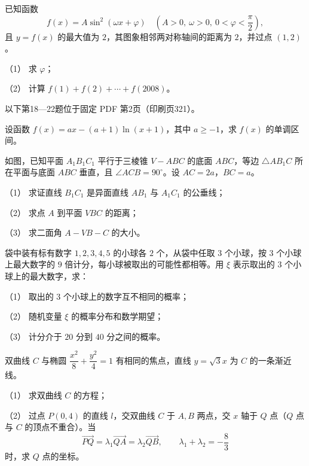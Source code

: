\begin{question}
已知函数
\nopagebreak[4]
\[
f(x)=A\sin^2(\omega x+\varphi)\quad
\left(A>0,\ \omega>0,\ 0<\varphi<\dfrac{\pi}{2}\right),
\]
且 $y=f(x)$ 的最大值为 $2$，其图象相邻两对称轴间的距离为 $2$，并过点 $(1,2)$。

（1） 求 $\varphi$；

（2） 计算 $f(1)+f(2)+\cdots+f(2008)$。

\begin{gktip}
以下第18—22题位于固定 PDF 第2页（印刷页321）。
\end{gktip}

\end{question}
\begin{question}
设函数 $f(x)=ax-(a+1)\ln(x+1)$，其中 $a\ge -1$，求 $f(x)$ 的单调区间。

\Needspace{0.4\textheight}
\end{question}
\begin{question}
如图，已知平面 $A_1B_1C_1$ 平行于三棱锥 $V-ABC$ 的底面 $ABC$，等边 $\triangle AB_1C$ 所在平面与底面 $ABC$ 垂直，且 $\angle ACB=90^\circ$。设 $AC=2a$，$BC=a$。

（1） 求证直线 $B_1C_1$ 是异面直线 $AB_1$ 与 $A_1C_1$ 的公垂线；

（2） 求点 $A$ 到平面 $VBC$ 的距离；

（3） 求二面角 $A-VB-C$ 的大小。
\nopagebreak[4]
\begin{center}\end{center}
\nopagebreak[4]
\end{question}
\begin{question}
袋中装有标有数字 $1,2,3,4,5$ 的小球各 $2$ 个，从袋中任取 $3$ 个小球，按 $3$ 个小球上最大数字的 $9$ 倍计分，每小球被取出的可能性都相等。用 $\xi$ 表示取出的 $3$ 个小球上的最大数字，求：

（1） 取出的 $3$ 个小球上的数字互不相同的概率；

（2） 随机变量 $\xi$ 的概率分布和数学期望；

（3） 计分介于 $20$ 分到 $40$ 分之间的概率。

\end{question}
\begin{question}
双曲线 $C$ 与椭圆 $\dfrac{x^2}{8}+\dfrac{y^2}{4}=1$ 有相同的焦点，直线 $y=\sqrt3x$ 为 $C$ 的一条渐近线。

（1） 求双曲线 $C$ 的方程；

（2） 过点 $P(0,4)$ 的直线 $l$，交双曲线 $C$ 于 $A,B$ 两点，交 $x$ 轴于 $Q$ 点（$Q$ 点与 $C$ 的顶点不重合）。当
\nopagebreak[4]
\[
\overrightarrow{PQ}=\lambda_1\overrightarrow{QA}=\lambda_2\overrightarrow{QB},\qquad
\lambda_1+\lambda_2=-\dfrac83
\]
时，求 $Q$ 点的坐标。

\end{question}
